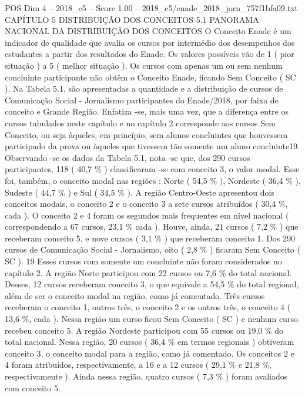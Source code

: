 \begin{textsample}{POS Dim 4 – 2018\_c5 – Score 1.00 – 2018\_c5/enade\_2018\_jorn\_757f1bfa09.txt}  \label{ex:f4_pos_223}
CAPÍTULO 5 DISTRIBUIÇÃO DOS CONCEITOS 5.1 PANORAMA NACIONAL DA DISTRIBUIÇÃO DOS CONCEITOS O Conceito Enade é um indicador de qualidade que avalia os cursos por intermédio dos desempenhos dos estudantes a partir dos resultados do Enade.
Os valores possíveis vão de 1 ( pior situação ) a 5 ( melhor situação ).
Os cursos com apenas um ou sem nenhum concluinte participante não obtêm o Conceito Enade, ficando Sem Conceito ( SC ).
Na Tabela 5.1, são apresentadas a quantidade e a distribuição de cursos de Comunicação Social - Jornalismo participantes do Enade/2018, por faixa de conceito e Grande Região.
Enfatiza -se, mais uma vez, que a diferença entre os cursos tabulados neste capítulo e no capítulo 2 corresponde aos cursos Sem Conceito, ou seja àqueles, em princípio, sem alunos concluintes que houvessem participado da prova ou àqueles que tivessem tão somente um aluno concluinte19.
Observando -se os dados da Tabela 5.1, nota -se que, dos 290 cursos participantes, 118 ( 40,7 \% ) classificaram -se com conceito 3, o valor modal.
Esse foi, também, o conceito modal nas regiões : Norte ( 54,5 \% ), Nordeste ( 36,4 \% ), Sudeste ( 44,7 \% ) e Sul ( 34,5 \% ).
A região Centro-Oeste apresentou dois conceitos modais, o conceito 2 e o conceito 3 a sete cursos atribuídos ( 30,4 \%, cada ).
O conceito 2 e 4 foram os segundos mais frequentes em nível nacional ( correspondendo a 67 cursos, 23,1 \% cada ).
Houve, ainda, 21 cursos ( 7,2 \% ) que receberam conceito 5, e nove cursos ( 3,1 \% ) que receberam conceito 1.
Dos 290 cursos de Comunicação Social - Jornalismo, oito ( 2,8 \% ) ficaram Sem Conceito ( SC ). 19 Esses cursos com somente um concluinte não foram considerados no capítulo 2.
A região Norte participou com 22 cursos ou 7,6 \% do total nacional.
Desses, 12 cursos receberam conceito 3, o que equivale a 54,5 \% do total regional, além de ser o conceito modal na região, como já comentado.
Três cursos receberam o conceito 1, outros três, o conceito 2 e os outros três, o conceito 4 ( 13,6 \%, cada ).
Nessa região um curso ficou Sem Conceito ( SC ) e nenhum curso recebeu conceito 5.
A região Nordeste participou com 55 cursos ou 19,0 \% do total nacional.
Nessa região, 20 cursos ( 36,4 \% em termos regionais ) obtiveram conceito 3, o conceito modal para a região, como já comentado.
Os conceitos 2 e 4 foram atribuídos, respectivamente, a 16 e a 12 cursos ( 29,1 \% e 21,8 \%, respectivamente ).
Ainda nessa região, quatro cursos ( 7,3 \% ) foram avaliados com conceito 5.

\end{textsample}
